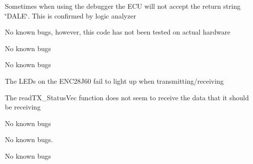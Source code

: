 
\begin{DoxyRefList}
\item[\label{bug__bug000001}%
\Hypertarget{bug__bug000001}%
File \mbox{\hyperlink{_communication_8c}{Communication.c}} ]Sometimes when using the debugger the E\+CU will not accept the return string \char`\"{}\+D\+A\+L\+E\char`\"{}. This is confirmed by logic analyzer  
\item[\label{bug__bug000002}%
\Hypertarget{bug__bug000002}%
File \mbox{\hyperlink{_engine__funcs_8c}{Engine\+\_\+funcs.c}} ]No known bugs, however, this code has not been tested on actual hardware  
\item[\label{bug__bug000003}%
\Hypertarget{bug__bug000003}%
File \mbox{\hyperlink{_e_s_b__funcs_8c}{E\+S\+B\+\_\+funcs.c}} ]No known bugs  
\item[\label{bug__bug000004}%
\Hypertarget{bug__bug000004}%
File \mbox{\hyperlink{_e_s_b__funcs_8h}{E\+S\+B\+\_\+funcs.h}} ]No known bugs  
\item[\label{bug__bug000005}%
\Hypertarget{bug__bug000005}%
File \mbox{\hyperlink{_ethernet_8c}{Ethernet.c}} ]The L\+E\+Ds on the E\+N\+C28\+J60 fail to light up when transmitting/receiving 

The read\+T\+X\+\_\+\+Status\+Vec function does not seem to receive the data that it should be receiving  
\item[\label{bug__bug000006}%
\Hypertarget{bug__bug000006}%
File \mbox{\hyperlink{_ethernet_8h}{Ethernet.h}} ]No known bugs  
\item[\label{bug__bug000007}%
\Hypertarget{bug__bug000007}%
File \mbox{\hyperlink{_initial__funcs_8c}{Initial\+\_\+funcs.c}} ]No known bugs.  
\item[\label{bug__bug000008}%
\Hypertarget{bug__bug000008}%
File \mbox{\hyperlink{main_8c}{main.c}} ]No known bugs 
\end{DoxyRefList}